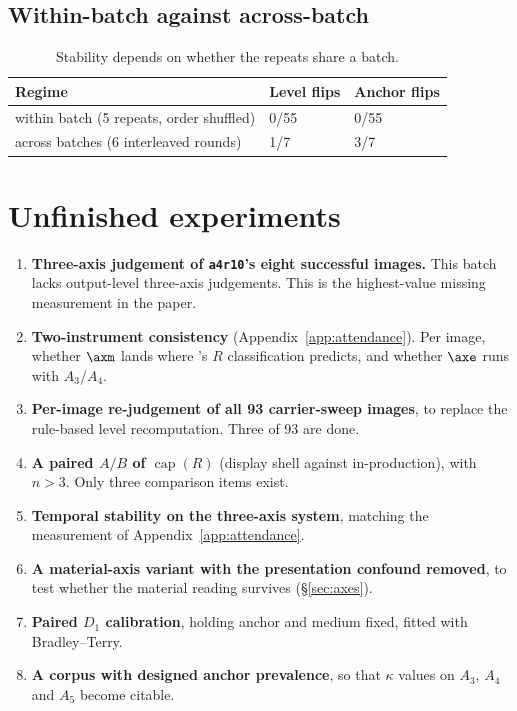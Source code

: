 \subsection{Within-batch against across-batch}

\begin{table}[H]
\centering\small
\begin{tabular}{@{}lll@{}}
\toprule
Regime & Level flips & Anchor flips \\
\midrule
within batch (5 repeats, order shuffled) & 0/55 & 0/55 \\
across batches (6 interleaved rounds) & 1/7 & 3/7 \\
\bottomrule
\end{tabular}
\caption{Stability depends on whether the repeats share a batch.}
\label{tab:batchcomp}
\end{table}

\section{Unfinished experiments}
\label{app:todo}

\begin{enumerate}
  \item \textbf{Three-axis judgement of \texttt{a4r10}'s eight successful
  images.} This batch lacks output-level three-axis judgements.
  This is the highest-value missing measurement in the paper.
  \item \textbf{Two-instrument consistency} (Appendix~\ref{app:attendance}). Per
  image, whether $\axm$ lands where \sexl's $R$ classification predicts, and
  whether $\axe$ runs with $A_3$/$A_4$.
  \item \textbf{Per-image re-judgement of all 93 carrier-sweep images}, to
  replace the rule-based level recomputation. Three of 93 are
  done.
  \item \textbf{A paired $A/B$ of $\operatorname{cap}(R)$} (display shell
  against in-production), with $n>3$. Only three comparison items exist.
  \item \textbf{Temporal stability on the three-axis system}, matching the
  \sexl{} measurement of Appendix~\ref{app:attendance}.
  \item \textbf{A material-axis variant with the presentation confound
  removed}, to test whether the material reading survives
  (\S\ref{sec:axes}).
  \item \textbf{Paired $D_1$ calibration}, holding anchor and medium fixed,
  fitted with Bradley--Terry.
  \item \textbf{A corpus with designed anchor prevalence}, so that $\kappa$
  values on $A_3$, $A_4$ and $A_5$ become citable.
\end{enumerate}

